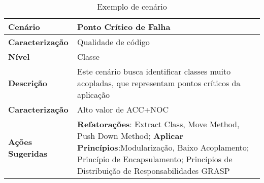 \begin{table}[H]
		\begin{center}
	    \begin{tabular}{ | p{2cm}  |p{} |}
	    \hline
	    \textbf{Cenário} & Ponto Crítico de Falha \\ 	\hline
	    \textbf{Caracterização} & Qualidade de código \\ 	\hline
	    \textbf{Nível} & Classe \\ 	\hline
	    \textbf{Descrição} & Este cenário busca identificar classes muito acopladas, que representam pontos críticos da aplicação \\ \hline
	    \textbf{Caracterização} & Alto valor de ACC+NOC \\ 	\hline
	    \textbf{Ações Sugeridas} & \textbf{Refatorações}: Extract Class, Move Method, Push Down Method; \textbf{Aplicar Princípios}:Modularização, Baixo Acoplamento; Princípio de Encapsulamento; Princípios de Distribuição de Responsabilidades GRASP \\ 	\hline
	    \end{tabular}
		    \caption{Exemplo de cenário}
		    \label{tab:resumo2}
		\end{center}
	\end{table}


